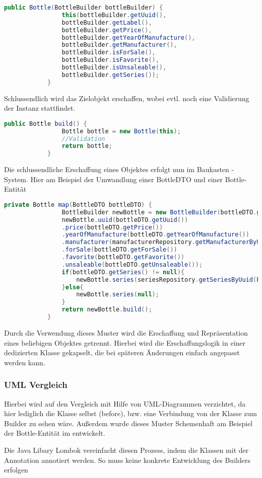 		\begin{lstlisting}[language=java,caption={Beispiel einer Builder Methode},gobble=11]
			public Bottle(BottleBuilder bottleBuilder) {
				this(bottleBuilder.getUuid(),
				bottleBuilder.getLabel(), 
				bottleBuilder.getPrice(), 
				bottleBuilder.getYearOfManufacture(), 
				bottleBuilder.getManufacturer(), 
				bottleBuilder.isForSale(), 
				bottleBuilder.isFavorite(), 
				bottleBuilder.isUnsaleable(),
				bottleBuilder.getSeries());
			}
		\end{lstlisting}
		Schlussendlich wird das Zielobjekt erschaffen, wobei evtl. noch eine Validierung der Instanz stattfindet.
		\begin{lstlisting}[language=java,caption={Beispiel einer build() Methode eines Builders},gobble=11]
			public Bottle build() {
				Bottle bottle = new Bottle(this);
				//Validation
				return bottle;
			}
		\end{lstlisting}
		Die schlussendliche Erschaffung eines Objektes erfolgt nun im Baukasten - System. Hier am Beispiel der Umwandlung einer BottleDTO und einer Bottle-Entität
		\begin{lstlisting}[language=java,caption={Beispiel einer build() Methode eines Builders},gobble=11,basicstyle=\tiny]
			private Bottle map(BottleDTO bottleDTO) {
				BottleBuilder newBottle = new BottleBuilder(bottleDTO.getLabel());
				newBottle.uuid(bottleDTO.getUuid())
				.price(bottleDTO.getPrice())
				.yearOfManufacture(bottleDTO.getYearOfManufacture())
				.manufacturer(manufacturerRepository.getManufacturerByUuid(bottleDTO.getManufacturer().getUuid()))
				.forSale(bottleDTO.getForSale())
				.favorite(bottleDTO.getFavorite())
				.unsaleable(bottleDTO.getUnsaleable());
				if(bottleDTO.getSeries() != null){
					newBottle.series(seriesRepository.getSeriesByUuid(bottleDTO.getSeries().getUuid()));
				}else{
					newBottle.series(null);
				}
				return newBottle.build();
			}
		\end{lstlisting}
		Durch die Verwendung dieses Muster wird die Erschaffung und Repräsentation eines beliebigen Objektes getrennt. Hierbei wird die Erschaffungslogik in einer dedizierten Klasse gekapselt, die bei späteren Änderungen einfach angepasst werden kann.
		
		\subsubsection{UML Vergleich}
		Hierbei wird auf den Vergleich mit Hilfe von \ac{UML}-Diagrammen verzichtet, da hier lediglich die Klasse selbst (before), bzw. eine Verbindung von der Klasse zum Builder zu sehen wäre. Außerdem wurde dieses Muster Schemenhaft am Beispiel der Bottle-Entität im  entwickelt. 
		\par Die Java Libary Lombok vereinfacht diesen Prozess, indem die Klassen mit der Annotation  annotiert werden. So muss keine konkrete Entwicklung des Builders erfolgen